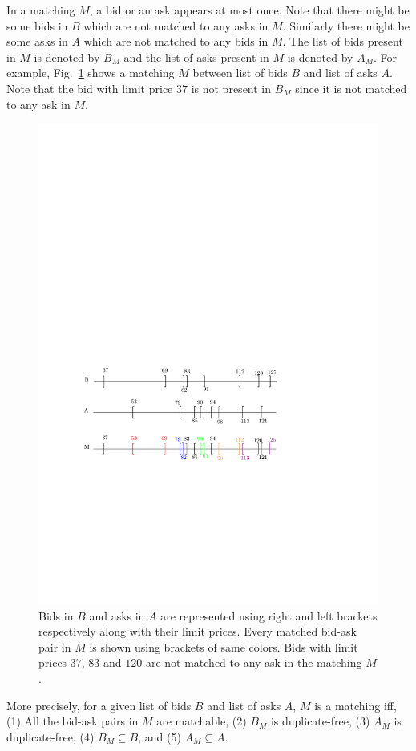\documentclass[a4paper,UKenglish,cleveref, autoref]{lipics-v2019}
\begin{document}
In a matching $M$, a bid or an ask appears at most once. Note that there might be some bids in $B$ which are not matched to any asks in $M$. Similarly there might be some asks in $A$ which are not matched to any bids in $M$. The list of bids present in $M$ is denoted by $B_{M}$ and the list of asks present in $M$ is denoted by $A_M$. For example, Fig.~\ref{fig:matching} shows a matching $M$ between list of bids $B$ and list of asks $A$. Note that the bid with limit price $37$ is not present in $B_M$ since it is not matched to any ask in $M$.  

\begin{figure}[h!]
\centering
\includegraphics[width=.6\textwidth]{brack_matching.pdf}
\caption{ Bids in $B$ and asks in $A$ are represented using right and left brackets respectively along with their limit prices. Every matched bid-ask pair in $M$ is shown using  brackets of same colors. Bids with limit prices $37$, $83$ and $120$ are not matched to any ask in the matching $M$.}
\label{fig:matching}
\end{figure}

More precisely, for a given list of bids $B$ and list of asks $A$, $M$ is a matching iff, (1) All the bid-ask pairs in $M$ are matchable, (2) $B_M$ is duplicate-free, (3) $A_M$ is duplicate-free, (4) $B_M \subseteq B$, and (5) $A_M \subseteq A$.
\end{document}
